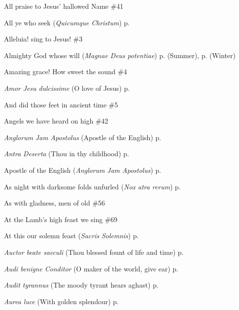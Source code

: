 \begin{hangparas}{1.25em}{1}
\par\noindent
All praise to Jesus' hallowed Name \dotfill \#41
\par\noindent
All ye who seek (\textit{Quicumque Christum}) \dotfill p. \pageref{TransfigurationEvensong}
\par\noindent
Alleluia! sing to Jesus!  \dotfill \#3
\par\noindent
Almighty God whose will (\textit{Magnae Deus potentiae}) \dotfill p. \pageref{ThursdayEvensongSummer} (Summer), p. \pageref{ThursdayEvensongWinter} (Winter)
\par\noindent
Amazing grace! How sweet the sound \dotfill \#4
\par\noindent
\textit{Amor Jesu dulcissime} (O love of Jesus) \dotfill p. \pageref{TransfigurationMattins}
\par\noindent
And did those feet in ancient time \dotfill \#5
\par\noindent
Angels we have heard on high \dotfill \#42
\par\noindent
\textit{Anglorum Jam Apostolus} (Apostle of the English) \dotfill p. \pageref{GregoryEvensong}
\par\noindent
\textit{Antra Deserta} (Thou in thy childhood) \dotfill p. \pageref{JohnBaptistInvitatory}
\par\noindent
Apostle of the English (\textit{Anglorum Jam Apostolus}) \dotfill p. \pageref{GregoryEvensong}
\par\noindent
As night with darksome folds unfurled (\textit{Nox atra rerum}) \dotfill p. \pageref{ThursdayInvitatory}
\par\noindent
As with gladness, men of old \dotfill \#56
\par\noindent
At the Lamb's high feast we sing \dotfill \#69
\par\noindent
At this our solemn feast (\textit{Sacris Solemnis}) \dotfill p. \pageref{CorpusChristiInvitatory}
\par\noindent
\textit{Auctor beate saeculi} (Thou blessed fount of life and time) \dotfill p. \pageref{CompassionEvensong}
\par\noindent
\textit{Audi benigne Conditor} (O maker of the world, give ear) \dotfill p. \pageref{FirstLentEvensong}
\par\noindent
\textit{Audit tyrannus} (The moody tyrant hears aghast) \dotfill p. \pageref{HolyInnocentsInvitatory}
\par\noindent
\textit{Aurea luce} (With golden splendour) \dotfill p. \pageref{PeterEvensong}
\par\noindent

\end{hangparas}
